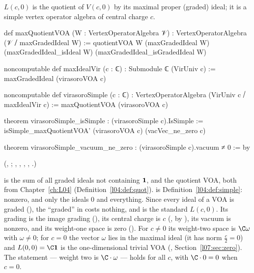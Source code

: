 \begin{definition}\label{l07:def:Lc}
$L(c,0)$ is the quotient of $V(c,0)$ by its maximal proper (graded) ideal; it is a simple vertex
operator algebra of central charge $c$.
\end{definition}
\begin{leancode}
def maxQuotientVOA (W : VertexOperatorAlgebra 𝒱) :
    VertexOperatorAlgebra (𝒱 ⧸ maxGradedIdeal W) :=
  quotientVOA W (maxGradedIdeal W) (maxGradedIdeal_isIdeal W) (maxGradedIdeal_isGradedIdeal W)

noncomputable def maxIdealVir (c : ℂ) : Submodule ℂ (VirUniv c) :=
  maxGradedIdeal (virasoroVOA c)

noncomputable def virasoroSimple (c : ℂ) :
    VertexOperatorAlgebra (VirUniv c ⧸ maxIdealVir c) :=
  maxQuotientVOA (virasoroVOA c)

theorem virasoroSimple_isSimple : (virasoroSimple c).IsSimple :=
  isSimple_maxQuotientVOA' (virasoroVOA c) (vacVec_ne_zero c)

theorem virasoroSimple_vacuum_ne_zero : (virasoroSimple c).vacuum ≠ 0 := by
\end{leancode}
(, ;
, , ,
, .)

\begin{dictionary}
 is the sum of all graded ideals not containing $\mathbf{1}$, and
 the quotient VOA, both from Chapter~\ref{ch:L04} (Definition~\ref{l04:def:quot}).
 is Definition~\ref{l04:def:simple}: nonzero, and only the ideals $0$ and
everything. Since every ideal of a VOA is graded (), the
``graded'' in  costs nothing, and  is the standard
$L(c,0)$. Its grading is the image grading (), its central charge is
$c$ (, by ), its vacuum is nonzero, and its weight-one
space is zero (). For $c\ne0$ its weight-two space is $\C\omega$
with $\omega\ne0$; for $c = 0$ the vector $\omega$ lies in the maximal ideal (it has norm $\frac c2 = 0$)
and $L(0,0) = \C\lsevenvac$ is the one-dimensional trivial VOA (,
Section~\ref{l07:sec:zero}). The statement  --- weight two is
$\C\cdot\omega$ --- holds for all $c$, with $\C\cdot0 = 0$ when $c = 0$.
\end{dictionary}

